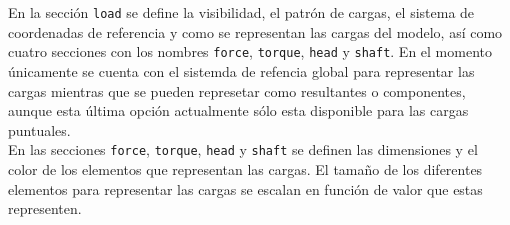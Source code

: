 En la sección \verb|load| se define la visibilidad, el patrón de cargas, el sistema de coordenadas de referencia y como se representan las cargas del modelo, así como cuatro secciones con los nombres \verb|force|, \verb|torque|, \verb|head| y \verb|shaft|. En el momento únicamente se cuenta con el sistemda de refencia global para representar las cargas mientras que se pueden represetar como resultantes o componentes, aunque esta última opción actualmente sólo esta disponible para las cargas puntuales.\\

En las secciones \verb|force|, \verb|torque|, \verb|head| y \verb|shaft| se definen las dimensiones y el color de los elementos que representan las cargas. El tamaño de los diferentes elementos para representar las cargas se escalan en función de valor que estas representen.\\